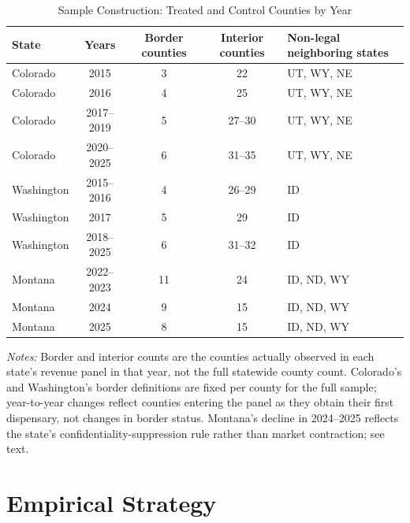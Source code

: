 \documentclass[12pt]{article}
\begin{document}
\begin{table}[htbp]
\centering
\caption{Sample Construction: Treated and Control Counties by Year}
\label{tab:sample_construction}
\small
\begin{tabular}{lcccl}
\toprule
State & Years & Border counties & Interior counties & Non-legal neighboring states \\
\midrule
Colorado & 2015 & 3 & 22 & UT, WY, NE \\
Colorado & 2016 & 4 & 25 & UT, WY, NE \\
Colorado & 2017--2019 & 5 & 27--30 & UT, WY, NE \\
Colorado & 2020--2025 & 6 & 31--35 & UT, WY, NE \\
Washington & 2015--2016 & 4 & 26--29 & ID \\
Washington & 2017 & 5 & 29 & ID \\
Washington & 2018--2025 & 6 & 31--32 & ID \\
Montana & 2022--2023 & 11 & 24 & ID, ND, WY \\
Montana & 2024 & 9 & 15 & ID, ND, WY \\
Montana & 2025 & 8 & 15 & ID, ND, WY \\
\bottomrule
\end{tabular}
\begin{minipage}{0.95\textwidth}
\vspace{0.3em}
\footnotesize
\textit{Notes:} Border and interior counts are the counties actually observed in each state's revenue panel
in that year, not the full statewide county count. Colorado's and Washington's border definitions are fixed
per county for the full sample; year-to-year changes reflect counties entering the panel as they obtain
their first dispensary, not changes in border status. Montana's decline in 2024--2025 reflects the state's
confidentiality-suppression rule rather than market contraction; see text.
\end{minipage}
\end{table}

\section{Empirical Strategy}
\label{sec:empirical_strategy}
\end{document}
